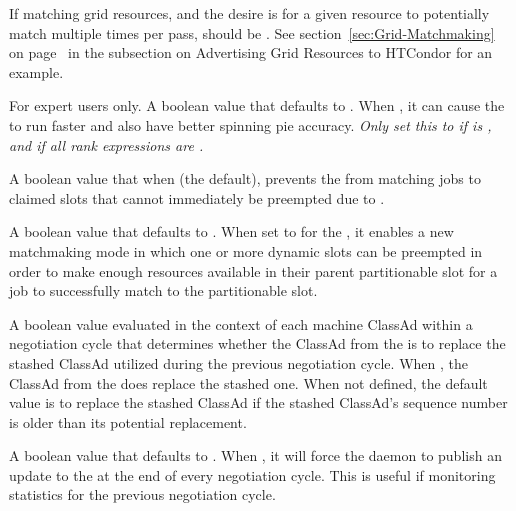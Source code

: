 \begin{description}
  If matching grid resources, and the desire is for a
  given resource to potentially match multiple times per 
  pass,  should be .
  See section~\ref{sec:Grid-Matchmaking} on page~\pageref{sec:Grid-Matchmaking}
  in the subsection on Advertising Grid Resources to HTCondor for an example.

\label{param:NegotiatorConsiderPreemption}
\item[\Macro{NEGOTIATOR\_CONSIDER\_PREEMPTION}]
  For expert users only. A boolean value that defaults to .
  When ,
  it can cause the  to run
  faster and also have better spinning pie accuracy.
  \emph{Only set this to  if 
  is ,
  and if all  rank expressions are .}

\label{param:NegotiatorConsiderEarlyPreemption}
\item[\Macro{NEGOTIATOR\_CONSIDER\_EARLY\_PREEMPTION}]
  A boolean value that when  (the default),
  prevents the  from matching jobs
  to claimed slots that cannot immediately be preempted
  due to .

\label{param:AllowPslotPreemption}
\item[\Macro{ALLOW\_PSLOT\_PREEMPTION}]
  A boolean value that defaults to .
  When set to  for the ,
  it enables a new matchmaking mode in which one or more dynamic slots 
  can be preempted in order to
  make enough resources available in their parent partitionable slot
  for a job to successfully match to the partitionable slot.

\label{param:StartdAdReevalExpr}
\item[\Macro{STARTD\_AD\_REEVAL\_EXPR}]
  A boolean value evaluated in the context of each machine ClassAd within
  a negotiation cycle that determines whether the ClassAd from the
   is to replace the stashed ClassAd utilized during
  the previous negotiation cycle.
  When ,
  the ClassAd from the  does replace the stashed one.
  When not defined, the default value is to replace the stashed ClassAd
  if the stashed ClassAd's sequence number is older than its potential
  replacement.

\label{param:NegotiatorUpdateAfterCycle}
\item[\Macro{NEGOTIATOR\_UPDATE\_AFTER\_CYCLE}]
  A boolean value that defaults to .
  When , it will force the  daemon to publish 
  an update to the  at the end of every negotiation cycle.
  This is useful if monitoring statistics for the previous negotiation cycle. 


\end{description}
